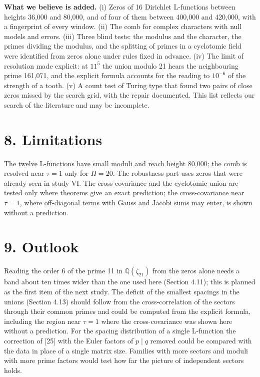 \documentclass[
  10pt,
]{article}
\begin{document}
\textbf{What we believe is added.} (i) Zeros of 16 Dirichlet L-functions
between heights 36,000 and 80,000, and of four of them between 400,000
and 420,000, with a fingerprint of every window. (ii) The comb for
complex characters with null models and errors. (iii) Three blind tests:
the modulus and the character, the primes dividing the modulus, and the
splitting of primes in a cyclotomic field were identified from zeros
alone under rules fixed in advance. (iv) The limit of resolution made
explicit: at \(11^5\) the union modulo 21 hears the neighbouring prime
161,071, and the explicit formula accounts for the reading to
\(10^{-6}\) of the strength of a tooth. (v) A count test of Turing type
that found two pairs of close zeros missed by the search grid, with the
repair documented. This list reflects our search of the literature and
may be incomplete.

\hypertarget{limitations}{%
\section{8. Limitations}\label{limitations}}

The twelve L-functions have small moduli and reach height 80,000; the
comb is resolved near \(\tau = 1\) only for \(H = 20\). The robustness
part uses zeros that were already seen in study VI. The cross-covariance
and the cyclotomic union are tested only where theorems give an exact
prediction; the cross-covariance near \(\tau = 1\), where off-diagonal
terms with Gauss and Jacobi sums may enter, is shown without a
prediction.

\hypertarget{outlook}{%
\section{9. Outlook}\label{outlook}}

Reading the order 6 of the prime 11 in \(\mathbb{Q}(\zeta_{21})\) from
the zeros alone needs a band about ten times wider than the one used
here (Section 4.11); this is planned as the first item of the next
study. The deficit of the smallest spacings in the unions (Section 4.13)
should follow from the cross-correlation of the sectors through their
common primes and could be computed from the explicit formula, including
the region near \(\tau = 1\) where the cross-covariance was shown here
without a prediction. For the spacing distribution of a single
L-function the correction of {[}25{]} with the Euler factors of
\(p \mid q\) removed could be compared with the data in place of a
single matrix size. Families with more sectors and moduli with more
prime factors would test how far the picture of independent sectors
holds.
\end{document}

